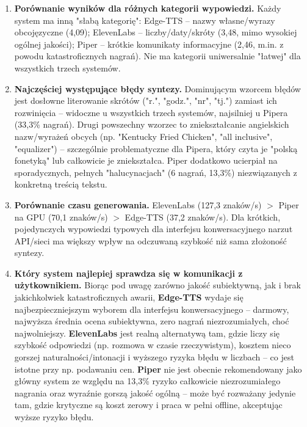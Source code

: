 \documentclass{article}
\begin{document}
\begin{enumerate}
    \item \textbf{Porównanie wyników dla różnych kategorii wypowiedzi.} Każdy system ma inną
    "słabą kategorię": Edge-TTS -- nazwy własne/wyrazy obcojęzyczne (4,09); ElevenLabs --
    liczby/daty/skróty (3,48, mimo wysokiej ogólnej jakości); Piper -- krótkie komunikaty
    informacyjne (2,46, m.in. z powodu katastroficznych nagrań). Nie ma kategorii uniwersalnie
    "łatwej" dla wszystkich trzech systemów.
    \item \textbf{Najczęściej występujące błędy syntezy.} Dominującym wzorcem błędów jest
    dosłowne literowanie skrótów ("r.", "godz.", "nr", "tj.") zamiast ich rozwinięcia --
    widoczne u wszystkich trzech systemów, najsilniej u Pipera (33,3\% nagrań). Drugi
    powszechny wzorzec to zniekształcanie angielskich nazw/wyrażeń obcych (np. "Kentucky Fried
    Chicken", "all inclusive", "equalizer") -- szczególnie problematyczne dla Pipera, który
    czyta je "polską fonetyką" lub całkowicie je zniekształca. Piper dodatkowo ucierpiał na
    sporadycznych, pełnych "halucynacjach" (6 nagrań, 13,3\%) niezwiązanych z konkretną treścią
    tekstu.
    \item \textbf{Porównanie czasu generowania.} ElevenLabs (127,3 znaków/s) $>$ Piper na GPU
    (70,1 znaków/s) $>$ Edge-TTS (37,2 znaków/s). Dla krótkich, pojedynczych wypowiedzi typowych
    dla interfejsu konwersacyjnego narzut API/sieci ma większy wpływ na odczuwaną szybkość niż
    sama złożoność syntezy.
    \item \textbf{Który system najlepiej sprawdza się w komunikacji z użytkownikiem.} Biorąc pod
    uwagę zarówno jakość subiektywną, jak i brak jakichkolwiek katastroficznych awarii,
    \textbf{Edge-TTS} wydaje się najbezpieczniejszym wyborem dla interfejsu konwersacyjnego --
    darmowy, najwyższa średnia ocena subiektywna, zero nagrań niezrozumiałych, choć najwolniejszy.
    \textbf{ElevenLabs} jest realną alternatywą tam, gdzie liczy się szybkość odpowiedzi
    (np. rozmowa w czasie rzeczywistym), kosztem nieco gorszej naturalności/intonacji i wyższego
    ryzyka błędu w liczbach -- co jest istotne przy np. podawaniu cen. \textbf{Piper} nie jest
    obecnie rekomendowany jako główny system ze względu na 13,3\% ryzyko całkowicie
    niezrozumiałego nagrania oraz wyraźnie gorszą jakość ogólną -- może być rozważany jedynie
    tam, gdzie krytyczne są koszt zerowy i praca w pełni offline, akceptując wyższe ryzyko
    błędu.
\end{enumerate}
\end{document}
